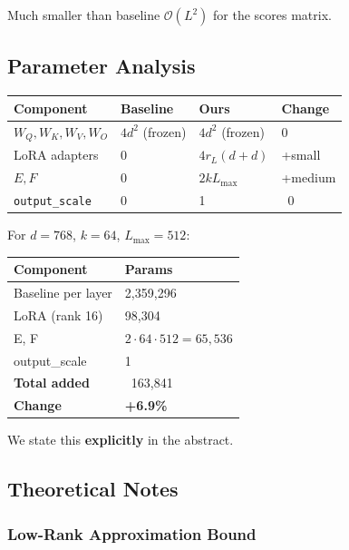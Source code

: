 Much smaller than baseline $\mathcal{O}(L^2)$ for the scores matrix.

\subsection{Parameter Analysis}

\begin{table}[H]
\centering
\small
\begin{tabular}{llll}
\toprule
\textbf{Component} & \textbf{Baseline} & \textbf{Ours} & \textbf{Change} \\
\midrule
$W_Q, W_K, W_V, W_O$ & $4 d^2$ (frozen) & $4 d^2$ (frozen) & 0 \\
LoRA adapters & 0 & $4 r_L (d + d)$ & +small \\
$E, F$ & 0 & $2 k L_\text{max}$ & +medium \\
\texttt{output\_scale} & 0 & 1 & ~0 \\
\bottomrule
\end{tabular}
\end{table}

For $d = 768$, $k = 64$, $L_\text{max} = 512$:

\begin{table}[H]
\centering
\small
\begin{tabular}{ll}
\toprule
\textbf{Component} & \textbf{Params} \\
\midrule
Baseline per layer & 2,359,296 \\
LoRA (rank 16) & 98,304 \\
E, F & $2 \cdot 64 \cdot 512 = 65,536$ \\
output\_scale & 1 \\
\textbf{Total added} & ~163,841 \\
\textbf{Change} & \textbf{+6.9\%} \\
\bottomrule
\end{tabular}
\end{table}

We state this \textbf{explicitly} in the abstract.

\subsection{Theoretical Notes}

\subsubsection{Low-Rank Approximation Bound}

